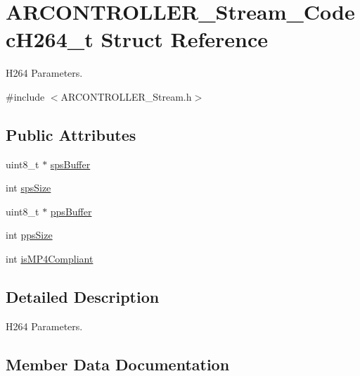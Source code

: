 \hypertarget{struct_a_r_c_o_n_t_r_o_l_l_e_r___stream___codec_h264__t}{}\section{A\+R\+C\+O\+N\+T\+R\+O\+L\+L\+E\+R\+\_\+\+Stream\+\_\+\+Codec\+H264\+\_\+t Struct Reference}
\label{struct_a_r_c_o_n_t_r_o_l_l_e_r___stream___codec_h264__t}


H264 Parameters.  




{\ttfamily \#include $<$A\+R\+C\+O\+N\+T\+R\+O\+L\+L\+E\+R\+\_\+\+Stream.\+h$>$}

\subsection*{Public Attributes}
\begin{DoxyCompactItemize}
\item 
uint8\+\_\+t $\ast$ \hyperlink{struct_a_r_c_o_n_t_r_o_l_l_e_r___stream___codec_h264__t_a2a65a8738ddaea3d18cfd99c171d1a67}{sps\+Buffer}
\item 
int \hyperlink{struct_a_r_c_o_n_t_r_o_l_l_e_r___stream___codec_h264__t_a99b2040726d6855c20f25893659d371e}{sps\+Size}
\item 
uint8\+\_\+t $\ast$ \hyperlink{struct_a_r_c_o_n_t_r_o_l_l_e_r___stream___codec_h264__t_a9f823ea5c9d5bada65ba040b215e0f9f}{pps\+Buffer}
\item 
int \hyperlink{struct_a_r_c_o_n_t_r_o_l_l_e_r___stream___codec_h264__t_affe65e60a4b4f98f64b3580fbf3342ce}{pps\+Size}
\item 
int \hyperlink{struct_a_r_c_o_n_t_r_o_l_l_e_r___stream___codec_h264__t_a79561f288a4e88aec3da37eecf0b2953}{is\+M\+P4\+Compliant}
\end{DoxyCompactItemize}


\subsection{Detailed Description}
H264 Parameters. 

\subsection{Member Data Documentation}
